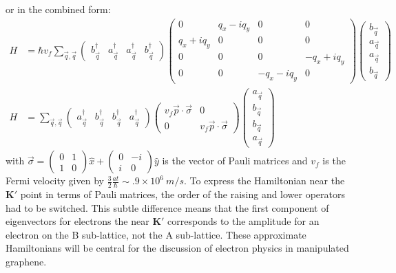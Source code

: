 or in the combined form:
\begin{align}
	H&=\hbar v_f \sum_{\vec q, \vec{q}}
		\left( \begin{array}{cccc} b^{\dagger}_{\vec{q}} & a^{\dagger}_{\vec{q}} & a^{\dagger}_{\vec{q}} & b^{\dagger}_{\vec{q}}
																							\end{array} \right)
		\left( \begin{array}{cccc}
			0              & q_x - i q_y & 0            & 0 \\
			q_x+i q_y      & 0           & 0            & 0 \\                            
			0              & 0           & 0            & -q_x+i q_y \\
			0              & 0           & -q_x-i q_y & 0			            			\end{array} \right)
		\left( \begin{array}{c } b_{\vec{q}} \\ a_{\vec{q}} \\ a_{\vec{q}} \\ b_{\vec{q}}  \end{array} \right) \nonumber \\
	H&=\sum_{\vec q, \vec{q}}
		\left( \begin{array}{cccc}  a^{\dagger}_{\vec{q}} & b^{\dagger}_{\vec{q}}&  b^{\dagger}_{\vec{q}} & a^{\dagger}_{\vec{q}}
																							\end{array} \right)
		\left( \begin{array}{cc}
			v_f \vec{p} \cdot \vec{\sigma}              & 0\\
			0              & v_f \vec{p} \cdot \vec{\sigma}			   	            			\end{array} \right)
		\left( \begin{array}{c }  a_{\vec{q}} \\ b_{\vec{q}} \\  b_{\vec{q}} \\ a_{\vec{q}} \end{array} \right)
	\label{eq:TB:FullH}
\end{align}
with $\vec{\sigma}= \left( \begin{array}{cc} 0 & 1 \\ 1 & 0 \end{array} \right) \hat{x}+\left( \begin{array}{cc} 0 & -i \\ i & 0 \end{array} \right) \hat{y}$ is the vector of Pauli matrices and $v_f$ is the Fermi velocity given by $\frac{3}{2}\frac{at}{\hbar} \sim .9 \times 10^6 \ m/s$.
To express the Hamiltonian near the $\bm{K'}$ point in terms of Pauli matrices, the order of the raising and lower operators had to be switched.
This subtle difference means that the first component of eigenvectors for electrons the near $\bm{K'}$ corresponds to the amplitude for an electron on the B sub-lattice, not the A sub-lattice.
These approximate Hamiltonians will be central for the discussion of electron physics in manipulated graphene.

